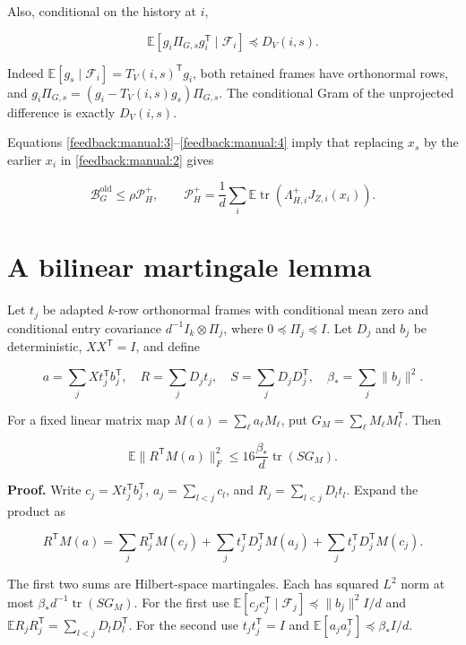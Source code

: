 \documentclass[11pt,oneside,openany,a4paper]{book}
\numberwithin{equation}{chapter}
\theoremstyle{definition}
\theoremstyle{remark}
\begin{document}
Also, conditional on the history at \(i\),

\[
\mathbb E[g_i\Pi_{G,s}g_i^{\mathsf T}\mid\mathcal F_i]
\preceq D_V(i,s).\tag{\thechapter.4}\label{feedback:manual:4}
\]

Indeed \(\mathbb E[g_s\mid\mathcal F_i]=T_V(i,s)^{\mathsf T}g_i\), both retained frames have orthonormal rows, and \(g_i\Pi_{G,s}=(g_i-T_V(i,s)g_s)\Pi_{G,s}\). The conditional Gram of the unprojected difference is exactly \(D_V(i,s)\).

Equations \eqref{feedback:manual:3}--\eqref{feedback:manual:4} imply that replacing \(x_s\) by the earlier \(x_i\) in \eqref{feedback:manual:2} gives

\[
\mathcal B_G^{\mathrm{old}}\le\rho\mathcal P_H^+,
\qquad
\mathcal P_H^+=\frac1d\sum_i\mathbb E\operatorname{tr}(\Lambda^+_{H,i}J_{Z,i}(x_i)).\tag{\thechapter.5}\label{feedback:manual:5}
\]

\section{A bilinear martingale lemma}\label{feedback:a-bilinear-martingale-lemma}

Let \(t_j\) be adapted \(k\)-row orthonormal frames with conditional mean zero and conditional entry covariance \(d^{-1}I_k\otimes\Pi_j\), where \(0\preceq\Pi_j\preceq I\). Let \(D_j\) and \(b_j\) be deterministic, \(XX^{\mathsf T}=I\), and define

\[
a=\sum_jXt_j^{\mathsf T}b_j^{\mathsf T},\quad R=\sum_jD_jt_j,
\quad S=\sum_jD_jD_j^{\mathsf T},\quad\beta_*=\sum_j\|b_j\|^2.
\]

For a fixed linear matrix map \(M(a)=\sum_\ell a_\ell M_\ell\), put \(G_M=\sum_\ell M_\ell M_\ell^{\mathsf T}\). Then

\[
\boxed{\displaystyle
\mathbb E\|R^{\mathsf T}M(a)\|_F^2
\le16\frac{\beta_*}{d}\operatorname{tr}(SG_M).}\tag{\thechapter.6}\label{feedback:manual:6}
\]

\textbf{Proof.} Write \(c_j=Xt_j^{\mathsf T}b_j^{\mathsf T}\), \(a_j=\sum_{l<j}c_l\), and \(R_j=\sum_{l<j}D_lt_l\). Expand the product as

\[
R^{\mathsf T}M(a)=\sum_jR_j^{\mathsf T}M(c_j)
+\sum_jt_j^{\mathsf T}D_j^{\mathsf T}M(a_j)
+\sum_jt_j^{\mathsf T}D_j^{\mathsf T}M(c_j).
\]

The first two sums are Hilbert-space martingales. Each has squared \(L^2\) norm at most \(\beta_*d^{-1}\operatorname{tr}(SG_M)\). For the first use \(\mathbb E[c_jc_j^{\mathsf T}\mid\mathcal F_j]\preceq\|b_j\|^2I/d\) and \(\mathbb E R_jR_j^{\mathsf T}=\sum_{l<j}D_lD_l^{\mathsf T}\). For the second use \(t_jt_j^{\mathsf T}=I\) and \(\mathbb E[a_ja_j^{\mathsf T}]\preceq\beta_*I/d\).
\end{document}
